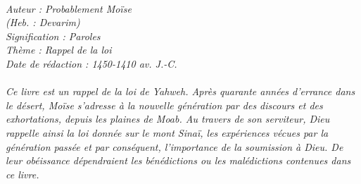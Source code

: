 \BFont
\noindent\hrulefill
{\footnotesize
\textit{
\bigskip
{\centering{}
\\Auteur : Probablement Moïse
\\(Heb. : Devarim)
\\Signification : Paroles
\\Thème : Rappel de la loi
\\Date de rédaction : 1450-1410 av. J.-C.\\}
}
\textit{
\\Ce livre est un rappel de la loi de Yahweh. Après quarante années d'errance dans le désert, Moïse s'adresse à la nouvelle génération par des discours et des exhortations, depuis les plaines de Moab. Au travers de son serviteur, Dieu rappelle ainsi la loi donnée sur le mont Sinaï, les expériences vécues par la génération passée et par conséquent, l'importance de la soumission à Dieu. De leur obéissance dépendraient les bénédictions ou les malédictions contenues dans ce livre.\bigskip
}
}
\par\nobreak\noindent\hrulefill
